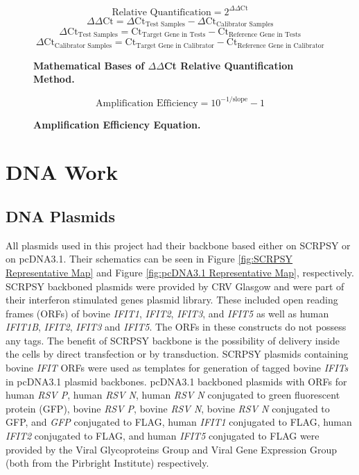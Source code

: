 \begin{figure}
$$\mbox{Relative Quantification} = 2^{\Delta\Delta \mbox{Ct}}$$
$$\Delta\Delta \mbox{Ct} = \Delta \mbox{Ct}_{\mbox{Test Samples}}-\Delta \mbox{Ct}_{\mbox{Calibrator Samples}}$$
$$\Delta \mbox{Ct}_{\mbox{Test Samples}} = \mbox{Ct}_{\mbox{Target Gene in Tests}}-\mbox{Ct}_{\mbox{Reference Gene in Tests}}$$
$$\Delta \mbox{Ct}_{\mbox{Calibrator Samples}} = \mbox{Ct}_{\mbox{Target Gene in Calibrator}}-\mbox{Ct}_{\mbox{Reference Gene in Calibrator}}$$
\caption[Mathematical Bases of $\Delta\Delta$Ct Relative Quantification Method.]{\textbf{Mathematical Bases of $\Delta\Delta$Ct Relative Quantification Method.}}
\label{eq:Mathematical Bases of delta delta Ct Relative Quantification Method}
\end{figure}

\begin{figure}
$$\mbox{Amplification Efficiency} = 10^{-1/\mbox{slope}}-1$$
\caption[Amplification Efficiency Equation.]{\textbf{Amplification Efficiency Equation.}}
\label{eq:Amplification Efficiency Equation}
\end{figure}

\section{DNA Work} \label{sec:DNA Work}
\subsection{DNA Plasmids} \label{subsec:DNA Plasmids}
All plasmids used in this project had their backbone based either on SCRPSY or on pcDNA3.1. Their schematics can be seen in Figure \ref{fig:SCRPSY Representative Map} and Figure \ref{fig:pcDNA3.1 Representative Map}, respectively. SCRPSY backboned plasmids were provided by CRV Glasgow and were part of their interferon stimulated genes plasmid library. These included open reading frames (ORFs) of bovine \textit{IFIT1}, \textit{IFIT2}, \textit{IFIT3}, and \textit{IFIT5} as well as human \textit{IFIT1B}, \textit{IFIT2}, \textit{IFIT3} and \textit{IFIT5}. The ORFs in these constructs do not possess any tags. The benefit of SCRPSY backbone is the possibility of delivery inside the cells by direct transfection or by transduction. SCRPSY plasmids containing bovine \textit{IFIT} ORFs were used as templates for generation of tagged bovine \textit{IFITs} in pcDNA3.1 plasmid backbones. pcDNA3.1 backboned plasmids with ORFs for human \textit{RSV P}, human \textit{RSV N}, human \textit{RSV N} conjugated to green fluorescent protein (GFP), bovine \textit{RSV P}, bovine \textit{RSV N}, bovine \textit{RSV N} conjugated to GFP, and \textit{GFP} conjugated to FLAG, human \textit{IFIT1} conjugated to FLAG, human \textit{IFIT2} conjugated to FLAG, and human \textit{IFIT5} conjugated to FLAG were provided by the Viral Glycoproteins Group and Viral Gene Expression Group (both from the Pirbright Institute) respectively.

